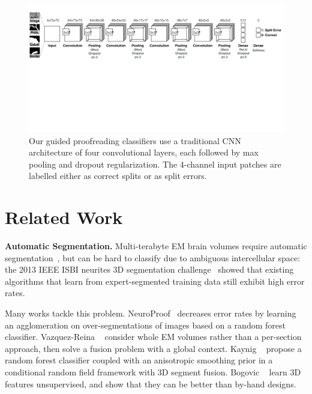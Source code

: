 \begin{figure}[t]
\begin{center}
\includegraphics[width=\linewidth]{gfx/architecture.pdf}
\end{center}
  \vspace{-4mm}
   \caption{Our guided proofreading classifiers use a traditional CNN architecture of four convolutional layers, each followed by max pooling and dropout regularization. The 4-channel input patches are labelled either as correct splits or as split errors.}
\label{fig:architecture}
\end{figure}

\section{Related Work}

\textbf{Automatic Segmentation.} Multi-terabyte EM brain volumes require automatic segmentation~\cite{jain2010,Liu2014,NunezIglesias2013Machine,GALA2014}, but can be hard to classify due to ambiguous intercellular space: the 2013 IEEE ISBI neurites 3D segmentation challenge~\cite{isbi_challenge} showed that existing algorithms that learn from expert-segmented training data still exhibit high error rates.

Many works tackle this problem. NeuroProof~\cite{neuroproof2013} decreases error rates by learning an agglomeration on over-segmentations of images based on a random forest classifier. Vazquez-Reina \etal~\cite{amelio_segmentation} consider whole EM volumes rather than a per-section approach, then solve a fusion problem with a global context. Kaynig \etal~\cite{kaynig10} propose a random forest classifier coupled with an anisotropic smoothing prior in a conditional random field framework with 3D segment fusion. Bogovic \etal~\cite{BogovicHJ13} learn 3D features unsupervised, and show that they can be better than by-hand designs.

